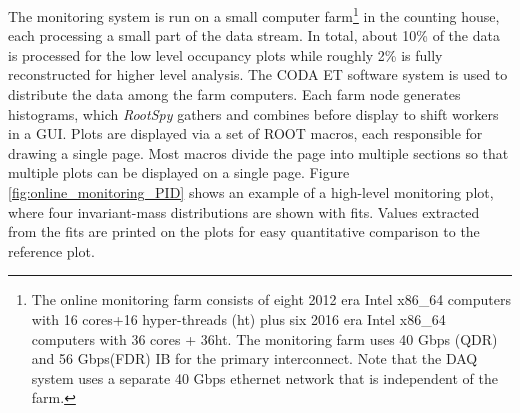 The monitoring system is run on a small computer farm\footnote{The online monitoring farm consists of eight 2012 era Intel x86\_64 computers with 16 cores+16 hyper-threads (ht) plus six 2016 era Intel x86\_64 computers with 36 cores + 36ht. The monitoring farm uses 40 Gbps (QDR) and 56 Gbps(FDR) IB for the primary interconnect. Note that the DAQ system uses a separate 40 Gbps ethernet network that is independent of the farm.} in the counting house, each processing a small part of the data stream. In total, about 10\% of the data is processed for the low level occupancy plots while roughly 2\% is fully reconstructed for higher level analysis. The CODA ET software system is used to distribute the data among the farm computers. Each farm node generates histograms, which \textit{RootSpy} gathers and combines before display to shift workers in a GUI.
Plots are displayed via a set of ROOT \cite{Brun:1997pa} macros, each responsible for drawing a single page. Most macros divide the page into multiple sections so that multiple plots can be displayed on a single page. Figure \ref{fig:online_monitoring_PID} shows an example of a high-level monitoring plot, where four invariant-mass distributions are shown with fits. Values extracted from the fits are printed on the plots for easy quantitative comparison to the reference plot. 



